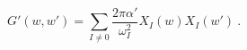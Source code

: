 \begin{equation}
   G'(w,w') = \sum_{I\neq 0} \frac{2\pi\alpha'}{\omega^2_I}X_I(w)X_I(w') \ .
\end{equation}

